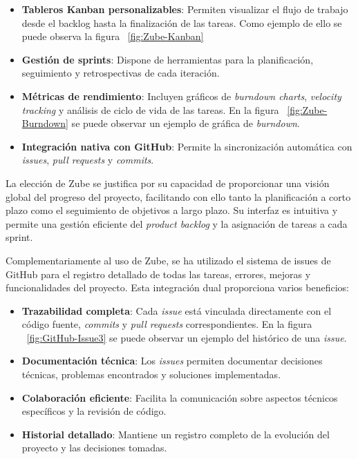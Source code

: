 \begin{itemize}
\tightlist
\item
\textbf{Tableros Kanban personalizables}: Permiten visualizar el flujo de trabajo desde el backlog hasta la finalización de las tareas. Como ejemplo de ello se puede observa la figura ~\ref{fig:Zube-Kanban}
\item


\textbf{Gestión de sprints}: Dispone de herramientas para la planificación, seguimiento y retrospectivas de cada iteración.
\item
\textbf{Métricas de rendimiento}: Incluyen gráficos de \emph{burndown charts}, \emph{velocity tracking} y análisis de ciclo de vida de las tareas. En la figura ~\ref{fig:Zube-Burndown} se puede observar un ejemplo de gráfica de \emph{burndown}.


\item
\textbf{Integración nativa con GitHub}: Permite la sincronización automática con \emph{issues}, \emph{pull requests} y \emph{commits}.
\end{itemize}

La elección de Zube se justifica por su capacidad de proporcionar una visión global del progreso del proyecto, facilitando con ello tanto la planificación a corto plazo como el seguimiento de objetivos a largo plazo. Su interfaz es intuitiva y permite una gestión eficiente del \emph{product backlog} y la asignación de tareas a cada sprint.

Complementariamente al uso de Zube, se ha utilizado el sistema de issues de GitHub para el registro detallado de todas las tareas, errores, mejoras y funcionalidades del proyecto. Esta integración dual proporciona varios beneficios:

\begin{itemize}
\tightlist
\item
\textbf{Trazabilidad completa}: Cada \emph{issue} está vinculada directamente con el código fuente, \emph{commits} y \emph{pull requests} correspondientes. En la figura ~\ref{fig:GitHub-Issue3} se puede observar un ejemplo del histórico de una \emph{issue}.
\item
\textbf{Documentación técnica}: Los \emph{issues} permiten documentar decisiones técnicas, problemas encontrados y soluciones implementadas.
\item
\textbf{Colaboración eficiente}: Facilita la comunicación sobre aspectos técnicos específicos y la revisión de código.
\item
\textbf{Historial detallado}: Mantiene un registro completo de la evolución del proyecto y las decisiones tomadas.
\end{itemize}

